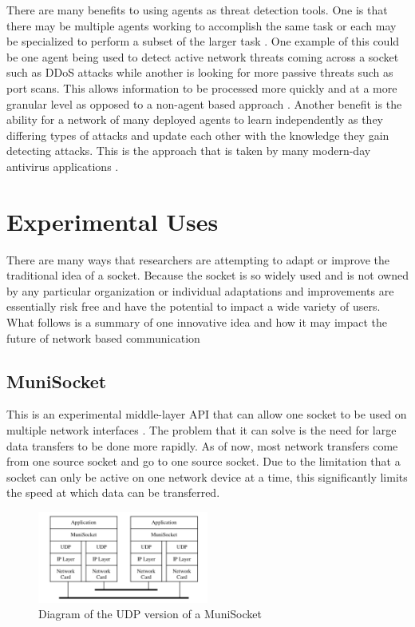 \documentclass[conference, 12pt]{IEEEtran}
\begin{document}
There are many benefits to using agents as threat detection tools. One is that there may be multiple agents working to accomplish the same task or each may be specialized to perform a subset of the larger task \cite{Arabo}. One example of this could be one agent being used to detect active network threats coming across a socket such as DDoS attacks while another is looking for more passive threats such as port scans. This allows information to be processed more quickly and at a more granular level as opposed to a non-agent based approach \cite{Arabo}. Another benefit is the ability for a network of many deployed agents to learn independently as they differing types of attacks and update each other with the knowledge they gain detecting attacks. This is the approach that is taken by many modern-day antivirus applications \cite{Arabo}.

\section{Experimental Uses}
There are many ways that researchers are attempting to adapt or improve the traditional idea of a socket. Because the socket is so widely used and is not owned by any particular organization or individual adaptations and improvements are essentially risk free and have the potential to impact a wide variety of users. What follows is a summary of one innovative idea and how it may impact the future of network based communication

\subsection{MuniSocket}
This is an experimental middle-layer API that can allow one socket to be used on multiple network interfaces \cite{Mohamed}. The problem that it can solve is the need for large data transfers to be done more rapidly. As of now, most network transfers come from one source socket and go to one source socket. Due to the limitation that a socket can only be active on one network device at a time, this significantly limits the speed at which data can be transferred.

\begin{figure}[htbp]
    \centering
    \centerline{\includegraphics[width=0.5\textwidth]{Figure2.png}}
    \caption{Diagram of the UDP version of a MuniSocket \cite{Mohamed}}
    \label{Figure2}
\end{figure}
\end{document}
